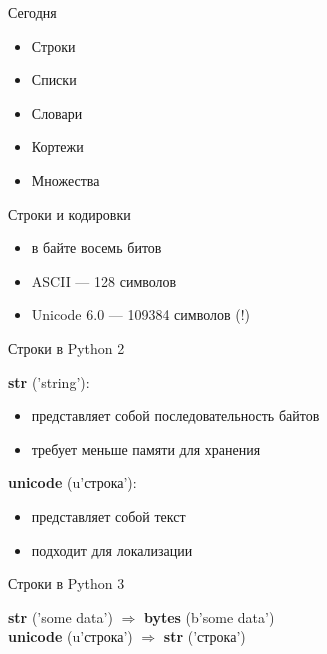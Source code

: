 \documentclass[hyperref={pdftex,unicode}]{beamer}
\begin{document}
\begin{frame}
  \maketitle
\end{frame}

\begin{frame}{Сегодня}
  \begin{itemize}
  \item Строки
  \item Списки
  \item Словари
  \item Кортежи
  \item Множества
  \end{itemize}
\end{frame}

\begin{frame}{Строки и кодировки}
  \begin{itemize}
    \item в байте восемь битов
    \item ASCII --- 128 символов
    \item Unicode 6.0 --- 109384 символов (!)
  \end{itemize}
\end{frame}

\begin{frame}{Строки в Python 2}
  \begin{minipage}{0.55\linewidth}
    \textbf{str} ('string'):
    \begin{itemize}
    \item представляет собой последовательность байтов
    \item требует меньше памяти для хранения
    \end{itemize}
  \end{minipage}
  \hfill
  \begin{minipage}{0.4\linewidth}
    \textbf{unicode} (u'строка'):
    \begin{itemize}
    \item представляет собой текст
    \item подходит для локализации
    \end{itemize}
  \end{minipage}
\end{frame}

\begin{frame}{Строки в Python 3}
  \begin{center}
    \textbf{str} ('some data') $ \Rightarrow $ \textbf{bytes} (b'some data') \\
    \vspace{1em}
    \textbf{unicode} (u'строка') $ \Rightarrow $ \textbf{str} ('строка')
  \end{center}
\end{frame}
\end{document}
